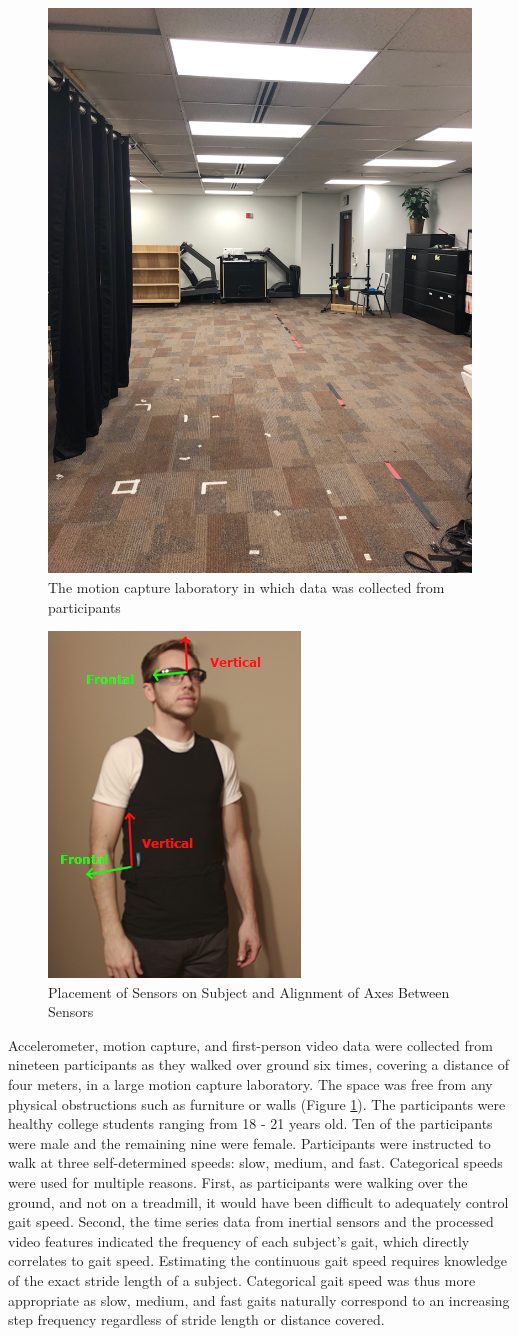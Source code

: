 \documentclass[12pt]{report}
\begin{document}
\begin{figure}[!t]
\centering
\includegraphics[width=1.8 in]{figure/MoCapRoom}
\caption{The motion capture laboratory in which data was collected from participants}
\label{fig_mocap}
\end{figure}

\begin{figure}[!t]
\centering
\includegraphics[width=1.8 in]{figure/sensorAlign}
\caption{Placement of Sensors on Subject and Alignment of Axes Between Sensors}
\label{fig_axes}
\end{figure}

Accelerometer, motion capture, and first-person video data were collected from nineteen participants as they walked over ground six times, covering a distance of four meters, in a large motion capture laboratory. The space was free from any physical obstructions such as furniture or walls (Figure \ref{fig_mocap}). The participants were healthy college students ranging from 18 - 21 years old. Ten of the participants were male and the remaining nine were female. Participants were instructed to walk at three self-determined speeds: slow, medium, and fast. Categorical speeds were used for multiple reasons. First, as participants were walking over the ground, and not on a treadmill, it would have been difficult to adequately control gait speed. Second, the time series data from inertial sensors and the processed video features indicated the frequency of each subject's gait, which directly correlates to gait speed. Estimating the continuous gait speed requires knowledge of the exact stride length of a subject. Categorical gait speed was thus more appropriate as slow, medium, and fast gaits naturally correspond to an increasing step frequency regardless of stride length or distance covered.
\end{document}
